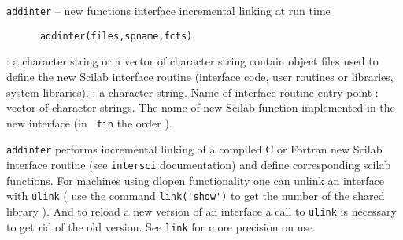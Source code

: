 
\begin{mandesc}
  \texttt{addinter} --  new functions interface incremental linking at run time\\ %
\end{mandesc}
\label{addinter}
\begin{calling_sequence}
\begin{verbatim}
      addinter(files,spname,fcts)  
\end{verbatim}
\end{calling_sequence}
\begin{parameters}
  \begin{varlist}
    : a character string or a vector of character string contain object files used to define the new Scilab interface routine (interface code, user routines or libraries, system libraries).
    : a character string. Name of interface routine entry point
    : vector of character strings. The name of new Scilab function implemented in the new interface (in \verb! fin! the order ).
  \end{varlist}
\end{parameters}
\begin{mandescription}
  \verb!addinter! performs incremental linking of a compiled C or Fortran
  new Scilab interface routine (see \verb!intersci! documentation)
  and define corresponding scilab functions.
  For machines using dlopen functionality one can unlink an interface 
  with \verb!ulink! ( use the command \verb!link('show')! to get the number 
  of the shared library ). And to reload a new version of an interface a call to \verb!ulink! is 
  necessary to get rid of the old version.
  See \verb!link! for more precision on use.
\end{mandescription}
\begin{manseealso}
       
\end{manseealso}

